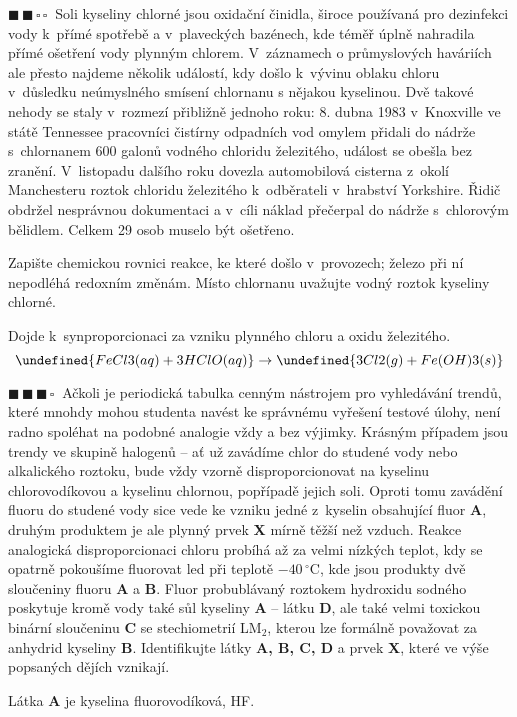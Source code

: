 \documentclass{book}
\let\ch\undefined
\newcommand{\dva}{$\blacksquare \, \blacksquare \, \square \, \square \; \; $}
\newcommand{\tri}{$\blacksquare \, \blacksquare \, \blacksquare \, \square \; \; $}
\renewenvironment{quotation}{\par}{\par} %
\begin{document}
\hrulefill %
\begin{quotation}
\dva Soli kyseliny chlorné jsou oxidační činidla, široce používaná pro
dezinfekci vody k~přímé spotřebě a v~plaveckých bazénech, kde téměř
úplně nahradila přímé ošetření vody plynným chlorem. V~záznamech
o průmyslových haváriích ale přesto najdeme několik událostí, kdy
došlo k~vývinu oblaku chloru v~důsledku neúmyslného smísení chlornanu
s nějakou kyselinou. Dvě takové nehody se staly v~rozmezí přibližně
jednoho roku: 8. dubna 1983 v~Knoxville ve státě Tennessee pracovníci
čistírny odpadních vod omylem přidali do nádrže s~chlornanem 600
galonů vodného chloridu železitého, událost se obešla bez zranění.
V~listopadu dalšího roku dovezla automobilová cisterna z~okolí Manchesteru
roztok chloridu železitého k~odběrateli v~hrabství Yorkshire. Řidič
obdržel nesprávnou dokumentaci a v~cíli náklad přečerpal do nádrže
s~chlorovým bělidlem. Celkem 29 osob muselo být ošetřeno.

Zapište chemickou rovnici reakce, ke které došlo v~provozech; železo
při ní nepodléhá redoxním změnám. Místo chlornanu uvažujte vodný roztok
kyseliny chlorné.
\end{quotation} \dotfill \par 

Dojde k~synproporcionaci za vzniku plynného chloru a oxidu železitého.
\[
\ch{FeCl3 (aq) + 3 HClO(aq)} \rightarrow \ch{3 Cl2 (g) + Fe(OH)3 (s)}
\]


\hrulefill %
\begin{quotation}
\tri Ačkoli je periodická tabulka cenným nástrojem pro vyhledávání trendů,
které mnohdy mohou studenta navést ke správnému vyřešení testové úlohy,
není radno spoléhat na podobné analogie vždy a bez výjimky. Krásným
případem jsou trendy ve skupině halogenů -- ať už zavádíme chlor
do studené vody nebo alkalického roztoku, bude vždy vzorně disproporcionovat
na kyselinu chlorovodíkovou a kyselinu chlornou, popřípadě jejich
soli. Oproti tomu zavádění fluoru do studené vody sice vede ke vzniku
jedné z~kyselin obsahující fluor \textbf{A}, druhým produktem je ale
plynný prvek \textbf{X} mírně těžší než vzduch. Reakce analogická
disproporcionaci chloru probíhá až za velmi nízkých teplot, kdy se
opatrně pokoušíme fluorovat led při teplotě $-40\,{^\circ}\mathrm{C}$,
kde jsou produkty dvě sloučeniny fluoru \textbf{A} a \textbf{B}. Fluor
probublávaný roztokem hydroxidu sodného poskytuje kromě vody také
sůl kyseliny \textbf{A} -- látku \textbf{D}, ale také velmi toxickou
binární sloučeninu \textbf{C} se stechiometrií LM$_{2}$, kterou lze
formálně považovat za anhydrid kyseliny \textbf{B}. Identifikujte
látky \textbf{A, B, C, D} a prvek \textbf{X}, které ve výše popsaných
dějích vznikají.
\end{quotation} \dotfill \par 
Látka \textbf{A} je kyselina fluorovodíková, HF.
\end{document}

